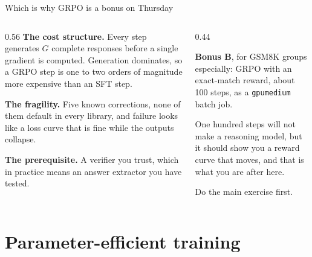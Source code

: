 \documentclass[aspectratio=169,10pt]{beamer}
\begin{document}
\begin{frame}{Which is why GRPO is a bonus on Thursday}
  \begin{columns}[T]
    \begin{column}{0.56\textwidth}
      \textbf{The cost structure.} Every step generates $G$ complete responses
      before a single gradient is computed. Generation dominates, so a GRPO
      step is one to two orders of magnitude more expensive than an SFT step.
      \vspace{0.5em}

      \textbf{The fragility.} Five known corrections, none of them default in
      every library, and failure looks like a loss curve that is fine while
      the outputs collapse.
      \vspace{0.5em}

      \textbf{The prerequisite.} A verifier you trust, which in practice means
      an answer extractor you have tested.
    \end{column}
    \begin{column}{0.44\textwidth}
      \begin{takeaway}
        \small
        \textbf{Bonus B}, for GSM8K groups especially: GRPO with an
        exact-match reward, about 100 steps, as a \texttt{gpumedium} batch job.
        \vspace{0.4em}

        One hundred steps will not make a reasoning model, but it should show
        you a reward curve that moves, and that is what you are after here.
        \vspace{0.4em}

        Do the main exercise first.
      \end{takeaway}
    \end{column}
  \end{columns}
\end{frame}

\section{Parameter-efficient training}
\end{document}
